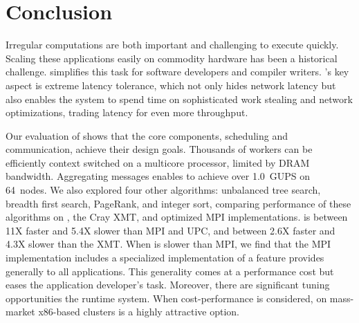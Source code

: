 \section{Conclusion}

Irregular computations are both important and challenging to execute
quickly.  Scaling these applications easily on commodity hardware has
been a historical challenge. \Grappa 
simplifies this task for software developers and compiler
writers. 
\Grappa's key aspect is extreme latency tolerance,
which not only hides network latency but also enables the system to
spend time on sophisticated work stealing and network optimizations,
trading latency for even more throughput.

Our evaluation of \Grappa shows that the core components, scheduling
and communication, achieve their design goals.  Thousands of workers
can be efficiently context switched on a multicore processor, limited by DRAM bandwidth.  Aggregating messages enables \Grappa to achieve
over 1.0~GUPS on 64~nodes.  We also explored four other algorithms:
unbalanced tree search, breadth first search, PageRank, and integer
sort, comparing performance of these algorithms on \Grappa, the Cray
XMT, and optimized MPI implementations. \Grappa is between 11X faster and 5.4X
slower than MPI and UPC, and between 2.6X faster and 4.3X slower than
the XMT. When \Grappa is slower than MPI, we find that the MPI
implementation includes a specialized implementation of a feature
\Grappa provides generally to all applications. This generality comes
at a performance cost but eases the application developer's
task. Moreover, there are significant tuning opportunities the \Grappa
runtime system.  When cost-performance is considered, \Grappa on mass-market
x86-based clusters is a highly attractive option.
